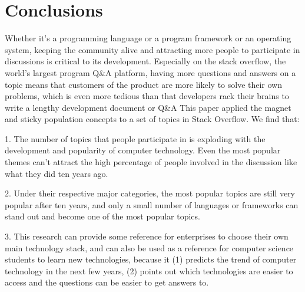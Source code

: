 \documentclass[conference]{IEEEtran}
\begin{document}
\section{Conclusions}

Whether it's a programming language or a program framework or an operating system, keeping the community alive and attracting more people to participate in discussions is critical to its development. Especially on the stack overflow, the world's largest program Q\&A platform, having more questions and answers on a topic means that customers of the product are more likely to solve their own problems, which is even more tedious than that developers rack their brains to write a lengthy development document or Q\&A This paper applied the magnet and sticky population concepts to a set of topics in Stack Overflow. We find that:

1. The number of topics that people participate in is exploding with the development and popularity of computer technology. Even the most popular themes can't attract the high percentage of people involved in the discussion like what they did ten years ago.
\smallskip\smallskip

2. Under their respective major categories, the most popular topics are still very popular after ten years, and only a small number of languages or frameworks can stand out and become one of the most popular topics.
\smallskip\smallskip

3. This research can provide some reference for enterprises to choose their own main technology stack, and can also be used as a reference for computer science students to learn new technologies, because it (1) predicts the trend of computer technology in the next few years, (2) points out which technologies are easier to access and the questions can be easier to get answers to.\\


\end{document}

